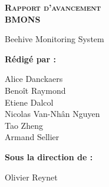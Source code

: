
\begingroup
\thispagestyle{empty}
\begin{center}
\vspace*{2cm}
{\Huge \textsc{\textbf{Rapport d'avancement}}}\\
\vspace*{2cm}
{\Huge \textbf{BMONS}}\par %
\vspace*{2cm}
{\huge Beehive Monitoring System}\par %
\end{center}
\vspace*{4cm}

\textbf{\huge Rédigé par :} 

\begin{center}
{
\huge
Alice Danckaers\\
Benoît Raymond\\
Etiene Dalcol\\
Nicolas Van-Nhân Nguyen\\
Tao Zheng\\
Armand Sellier\\
}
\end{center}

\vspace*{1cm}

{\huge \textbf{Sous la direction de :}}\\
\begin{center}
{\huge
Olivier Reynet\\
}
\end{center}
\endgroup
